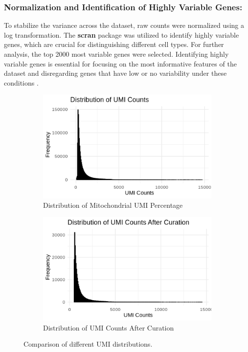 \documentclass[runningheads]{llncs}
\begin{document}
\subsubsection{Normalization and Identification of Highly Variable Genes:} To stabilize the variance across the dataset, raw counts were normalized using a log transformation. The \textbf{scran} package was utilized to identify highly variable genes, which are crucial for distinguishing different cell types. For further analysis, the top 2000 most variable genes were selected. Identifying highly variable genes is essential for focusing on the most informative features of the dataset and disregarding genes that have low or no variability under these conditions \cite{stuart2019comprehensive}.

\begin{figure}[H]
  \centering
  \begin{subfigure}[b]{0.45\textwidth}
    \centering
    \includegraphics[width=\textwidth]{000016.png}
    \caption{Distribution of Mitochondrial UMI Percentage}
    \label{fig:mito_umi}
  \end{subfigure}
  \hfill
  \begin{subfigure}[b]{0.45\textwidth}
    \centering
    \includegraphics[width=\textwidth]{000010.png}
    \caption{Distribution of UMI Counts After Curation}
    \label{fig:umi_counts}
  \end{subfigure}
  \caption{Comparison of different UMI distributions.}
  \label{fig:umi_distributions}
\end{figure}
\end{document}
